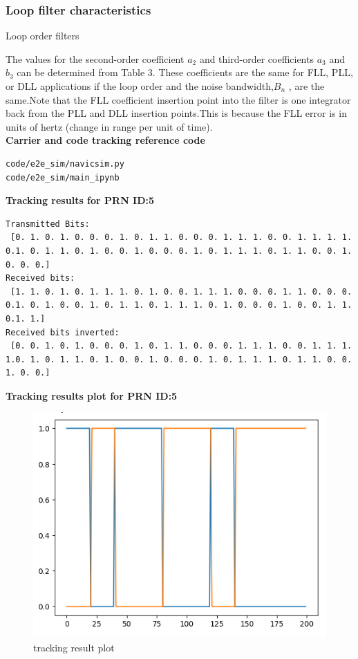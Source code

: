 \subsubsection{Loop filter characteristics}
\begin{table}[h]
\centering
	\caption{\Large{Loop order filters }}
	
\end{table}

The values for the second-order coefficient $a_2$ and third-order coefficients $a_3$ and $b_3$ can be determined from Table 3. These coefficients are the same for FLL, PLL, or DLL applications if the loop
order and the noise bandwidth,$B_n$ , are the same.Note that the FLL coefficient insertion point into the filter is one integrator back from the PLL and DLL insertion points.This is because the FLL error is in units of hertz (change in range per unit of time).\\
\textbf{Carrier and code tracking reference code }
\begin{lstlisting}
code/e2e_sim/navicsim.py
code/e2e_sim/main_ipynb
\end{lstlisting}
\textbf{Tracking results for PRN ID:5}
\begin{lstlisting}
Transmitted Bits:
 [0. 1. 0. 1. 0. 0. 0. 1. 0. 1. 1. 0. 0. 0. 1. 1. 1. 0. 0. 1. 1. 1. 1. 0.1. 0. 1. 1. 0. 1. 0. 0. 1. 0. 0. 0. 1. 0. 1. 1. 1. 0. 1. 1. 0. 0. 1. 0. 0. 0.]
Received bits:
 [1. 1. 0. 1. 0. 1. 1. 1. 0. 1. 0. 0. 1. 1. 1. 0. 0. 0. 1. 1. 0. 0. 0. 0.1. 0. 1. 0. 0. 1. 0. 1. 1. 0. 1. 1. 1. 0. 1. 0. 0. 0. 1. 0. 0. 1. 1. 0.1. 1.]
Received bits inverted:
 [0. 0. 1. 0. 1. 0. 0. 0. 1. 0. 1. 1. 0. 0. 0. 1. 1. 1. 0. 0. 1. 1. 1. 1.0. 1. 0. 1. 1. 0. 1. 0. 0. 1. 0. 0. 0. 1. 0. 1. 1. 1. 0. 1. 1. 0. 0. 1. 0. 0.]
\end{lstlisting}
\textbf{Tracking results plot for PRN ID:5}
\begin{figure}%
\includegraphics[width=0.5\columnwidth]{figs/tracking _plot.png}
\caption{tracking result plot}
\end{figure}



%
